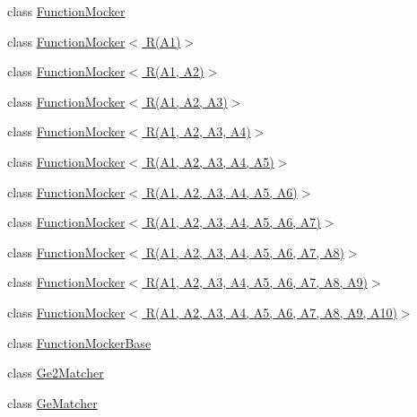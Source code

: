 \begin{DoxyCompactItemize}
\item 
class \hyperlink{classtesting_1_1internal_1_1FunctionMocker}{Function\+Mocker}
\item 
class \hyperlink{classtesting_1_1internal_1_1FunctionMocker_3_01R_07A1_08_4}{Function\+Mocker$<$ R(\+A1)$>$}
\item 
class \hyperlink{classtesting_1_1internal_1_1FunctionMocker_3_01R_07A1_00_01A2_08_4}{Function\+Mocker$<$ R(\+A1, A2)$>$}
\item 
class \hyperlink{classtesting_1_1internal_1_1FunctionMocker_3_01R_07A1_00_01A2_00_01A3_08_4}{Function\+Mocker$<$ R(\+A1, A2, A3)$>$}
\item 
class \hyperlink{classtesting_1_1internal_1_1FunctionMocker_3_01R_07A1_00_01A2_00_01A3_00_01A4_08_4}{Function\+Mocker$<$ R(\+A1, A2, A3, A4)$>$}
\item 
class \hyperlink{classtesting_1_1internal_1_1FunctionMocker_3_01R_07A1_00_01A2_00_01A3_00_01A4_00_01A5_08_4}{Function\+Mocker$<$ R(\+A1, A2, A3, A4, A5)$>$}
\item 
class \hyperlink{classtesting_1_1internal_1_1FunctionMocker_3_01R_07A1_00_01A2_00_01A3_00_01A4_00_01A5_00_01A6_08_4}{Function\+Mocker$<$ R(\+A1, A2, A3, A4, A5, A6)$>$}
\item 
class \hyperlink{classtesting_1_1internal_1_1FunctionMocker_3_01R_07A1_00_01A2_00_01A3_00_01A4_00_01A5_00_01A6_00_01A7_08_4}{Function\+Mocker$<$ R(\+A1, A2, A3, A4, A5, A6, A7)$>$}
\item 
class \hyperlink{classtesting_1_1internal_1_1FunctionMocker_3_01R_07A1_00_01A2_00_01A3_00_01A4_00_01A5_00_01A6_00_01A7_00_01A8_08_4}{Function\+Mocker$<$ R(\+A1, A2, A3, A4, A5, A6, A7, A8)$>$}
\item 
class \hyperlink{classtesting_1_1internal_1_1FunctionMocker_3_01R_07A1_00_01A2_00_01A3_00_01A4_00_01A5_00_01A6_00_01A7_00_01A8_00_01A9_08_4}{Function\+Mocker$<$ R(\+A1, A2, A3, A4, A5, A6, A7, A8, A9)$>$}
\item 
class \hyperlink{classtesting_1_1internal_1_1FunctionMocker_3_01R_07A1_00_01A2_00_01A3_00_01A4_00_01A5_00_01A6_0079295c90ba14a714e84d5a856a5b50dd}{Function\+Mocker$<$ R(\+A1, A2, A3, A4, A5, A6, A7, A8, A9, A10)$>$}
\item 
class \hyperlink{classtesting_1_1internal_1_1FunctionMockerBase}{Function\+Mocker\+Base}
\item 
class \hyperlink{classtesting_1_1internal_1_1Ge2Matcher}{Ge2\+Matcher}
\item 
class \hyperlink{classtesting_1_1internal_1_1GeMatcher}{Ge\+Matcher}
\item 

\end{DoxyCompactItemize}
